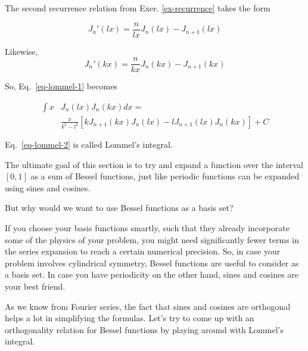 The second recurrence relation from Exer. \ref{ex-recurrence} takes the form

\begin{equation}
J_n'(lx) =  \frac{n}{lx}J_n(lx)-J_{n+1}(lx)
\end{equation} 

Likewise,
\begin{equation}
J_n'(kx) =  \frac{n}{kx}J_n(kx)-J_{n+1}(kx)
\end{equation} 

So, Eq.~\ref{eq-lommel-1} becomes

\begin{align}
  \int x & J_n(lx)J_n(kx)dx = \nonumber \\
  & \frac{x}{k^2 - l^2} \left[{k J_{n+1}(kx) J_n(lx) - l J_{n+1}(lx) J_n(kx)}\right] + C \label{eq-lommel-2}
\end{align} 

Eq.~\ref{eq-lommel-2} is called Lommel's integral.


\pagebreak


\label{week4}


The ultimate goal of this section is to try and expand a function over the interval $[0,1]$ as a sum of Bessel functions, just like periodic functions can be expanded using sines and cosines.

\begin{cue}
But why would we want to use Bessel functions as a basis set?
\end{cue}

If you choose your basis functions smartly, such that they already incorporate some of the physics of your problem, you might need significantly fewer terms in the series expansion to reach a certain numerical precision. So, in case your problem involves cylindrical symmetry, Bessel functions are useful to consider as a basis set. In case you have periodicity on the other hand, sines and cosines are your best friend.

As we know from Fourier series, the fact that sines and cosines are orthogonal helps a lot in simplifying the formulas. Let's try to come up with an orthogonality relation for Bessel functions by playing around with Lommel's integral.

